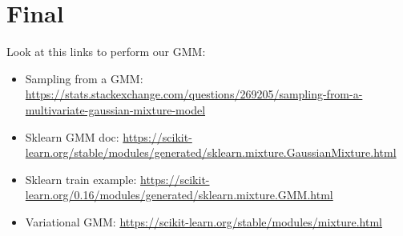 \documentclass{article}
\begin{document}
\section{Final}
Look at this links to perform our GMM:
\begin{itemize}
    \item Sampling from a GMM: \url{https://stats.stackexchange.com/questions/269205/sampling-from-a-multivariate-gaussian-mixture-model}
    \item Sklearn GMM doc: \url{https://scikit-learn.org/stable/modules/generated/sklearn.mixture.GaussianMixture.html}
    \item Sklearn train example: \url{https://scikit-learn.org/0.16/modules/generated/sklearn.mixture.GMM.html}
    \item Variational GMM: \url{https://scikit-learn.org/stable/modules/mixture.html}
\end{itemize}
\end{document}
